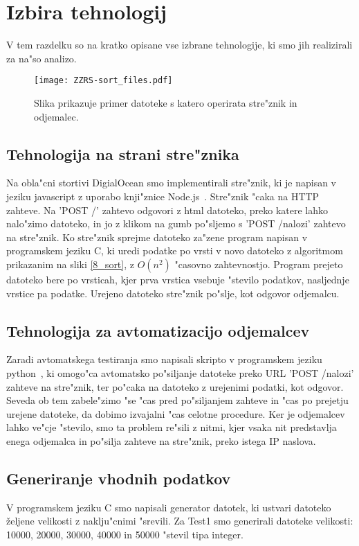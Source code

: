 \section{Izbira tehnologij}
V tem razdelku so na kratko opisane vse izbrane tehnologije, ki smo jih realizirali za na"so analizo.

\begin{figure}
  \centering
    \texttt{[image: ZZRS-sort\_files.pdf]}
  \caption{Slika prikazuje primer datoteke s katero operirata stre"znik in odjemalec.}
  \label{8_files}  
\end{figure}

\subsection{Tehnologija na strani stre"znika }
Na obla"cni stortivi DigialOcean smo implementirali stre"znik, ki je napisan v jeziku javascript z uporabo knji"znice Node.js~\cite{8_nodejs}. Stre"znik "caka na HTTP zahteve. Na 'POST /' zahtevo odgovori z html datoteko, preko katere lahko nalo"zimo datoteko, in jo z klikom na gumb po"sljemo s 'POST /nalozi' zahtevo na stre"znik. Ko stre"znik sprejme datoteko za"zene program napisan v programskem jeziku C, ki uredi podatke po vrsti v novo datoteko z algoritmom prikazanim na sliki \ref{8_sort}, z $O(n^2)$ "casovno zahtevnostjo. Program prejeto datoteko bere po vrsticah, kjer prva  vrstica vsebuje "stevilo podatkov, nasljednje vrstice pa podatke. Urejeno datoteko stre"znik po"slje, kot odgovor odjemalcu. 

\subsection{Tehnologija za avtomatizacijo odjemalcev}
Zaradi avtomatskega testiranja smo napisali skripto v programskem jeziku python~\cite{8_python}, ki omogo"ca avtomatsko po"siljanje datoteke preko URL 'POST /nalozi' zahteve na stre"znik, ter po"caka na datoteko z urejenimi podatki, kot odgovor. Seveda ob tem zabele"zimo "se "cas pred po"siljanjem zahteve in "cas po prejetju urejene datoteke, da dobimo izvajalni "cas celotne procedure. Ker je odjemalcev lahko ve"cje "stevilo, smo ta problem re"sili z nitmi, kjer vsaka nit predstavlja enega odjemalca in po"silja zahteve na stre"znik, preko istega IP naslova.

\subsection{Generiranje vhodnih podatkov}
V programskem jeziku C smo napisali generator datotek, ki ustvari datoteko željene velikosti z naklju"cnimi "srevili. Za Test1 smo generirali datoteke velikosti: 10000, 20000, 30000, 40000 in 50000 "stevil tipa integer.


